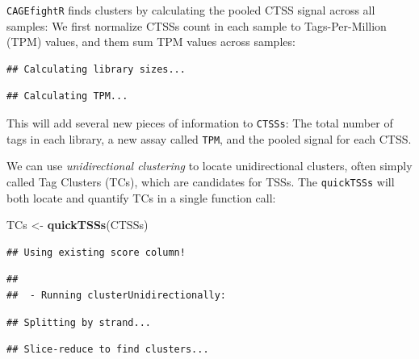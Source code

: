 \documentclass[9pt,a4paper,]{extarticle}
\newenvironment{Shaded}{\begin{snugshade}}{\end{snugshade}}
\newcommand{\KeywordTok}[1]{\textcolor[rgb]{0.13,0.29,0.53}{\textbf{{#1}}}}
\newcommand{\StringTok}[1]{\textcolor[rgb]{0.31,0.60,0.02}{{#1}}}
\newcommand{\NormalTok}[1]{{#1}}
\begin{document}
\texttt{CAGEfightR} finds clusters by calculating the pooled CTSS signal across all samples: We first normalize CTSSs count in each sample to Tags-Per-Million (TPM) values, and them sum TPM values across samples:

\begin{Shaded}
\end{Shaded}

\begin{verbatim}
## Calculating library sizes...
\end{verbatim}

\begin{verbatim}
## Calculating TPM...
\end{verbatim}

This will add several new pieces of information to \texttt{CTSSs}: The total number of tags in each library, a new assay called \texttt{TPM}, and the pooled signal for each CTSS.

We can use \emph{unidirectional clustering} to locate unidirectional clusters, often simply called Tag Clusters (TCs), which are candidates for TSSs. The \texttt{quickTSSs} will both locate and quantify TCs in a single function call:

\begin{Shaded}
\begin{Highlighting}[]
\NormalTok{TCs <-}\StringTok{ }\KeywordTok{quickTSSs}\NormalTok{(CTSSs)}
\end{Highlighting}
\end{Shaded}

\begin{verbatim}
## Using existing score column!
\end{verbatim}

\begin{verbatim}
## 
##  - Running clusterUnidirectionally:
\end{verbatim}

\begin{verbatim}
## Splitting by strand...
\end{verbatim}

\begin{verbatim}
## Slice-reduce to find clusters...
\end{verbatim}
\end{document}
